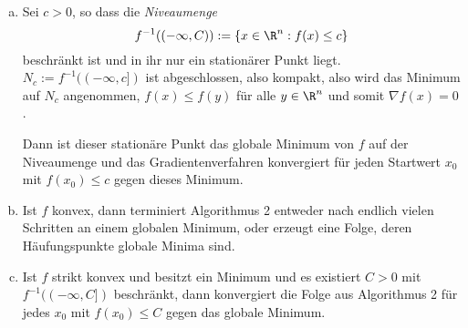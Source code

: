 \begin{kor} \label{2.26}
	\begin{enumerate}[(a)]
		\item
			Sei $c > 0$, so dass die \emph{Niveaumenge}
			\[
				f^{-1}((-\infty, C))
				:= \{ x \in \R^n : f(x) \le c \}
			\]
			beschränkt ist und in ihr nur ein stationärer Punkt liegt.
			$N_c := f^{-1}((-\infty,c])$ ist abgeschlossen, also kompakt, also wird das Minimum auf $N_c$ angenommen, $f(x) \le f(y)$ für alle $y \in \R^n$ und somit $\nabla f(x) = 0$.

			Dann ist dieser stationäre Punkt das globale Minimum von $f$ auf der Niveaumenge und das Gradientenverfahren konvergiert für jeden Startwert $x_0$ mit $f(x_0) \le c$ gegen dieses Minimum.
		\item
			Ist $f$ konvex, dann terminiert Algorithmus 2 %
			entweder nach endlich vielen Schritten an einem globalen Minimum, oder erzeugt eine Folge, deren Häufungspunkte globale Minima sind.
		\item
			Ist $f$ strikt konvex und besitzt ein Minimum und es existiert $C > 0$ mit $f^{-1}((-\infty,C])$ beschränkt, dann konvergiert die Folge aus Algorithmus 2 %
			für jedes $x_0$ mit $f(x_0) \le C$ gegen das globale Minimum.

	\end{enumerate}
\end{kor}




